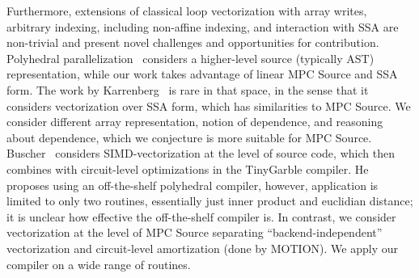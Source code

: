 Furthermore, extensions of classical loop vectorization with array writes, arbitrary indexing, including non-affine indexing, and interaction with SSA are non-trivial
and present novel challenges and opportunities for contribution. Polyhedral parallelization~\cite{Benabderrahmane:2010} considers a higher-level source (typically AST)
representation, while our work takes advantage of linear MPC Source and SSA form. The work by Karrenberg~\cite{Karrenberg:2015} is rare in that space, in the sense that it considers
vectorization over SSA form, which has similarities to MPC Source. We consider different array representation, notion of dependence, and reasoning
about dependence, which we conjecture is more suitable for MPC Source. Buscher~\cite{Buscher:2018} considers SIMD-vectorization
at the level of source code, which then combines with circuit-level optimizations in the TinyGarble compiler.
He proposes using an off-the-shelf polyhedral compiler, however, application is limited to only two routines,
essentially just inner product and euclidian distance; it is unclear how effective the off-the-shelf compiler is.
In contrast, we consider vectorization at the level of MPC Source separating ``backend-independent'' vectorization
and circuit-level amortization (done by MOTION). We apply our compiler on a wide range of routines.